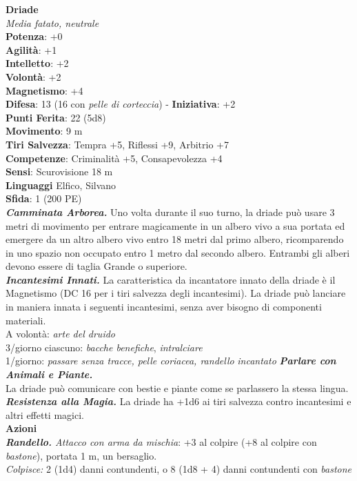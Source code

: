 \begin{multicols}{2}
\medskip\textbf{Driade}\\
\emph{Media fatato, neutrale}\\
\textbf{Potenza}: +0\\
\textbf{Agilità}: +1\\
\textbf{Intelletto}: +2\\
\textbf{Volontà}: +2\\
\textbf{Magnetismo}: +4\\
\textbf{Difesa}: 13 (16 con \emph{pelle di corteccia}) - \textbf{Iniziativa}: +2\\
\textbf{Punti Ferita}: 22 (5d8)\\
\textbf{Movimento}: 9 m\\
\textbf{Tiri Salvezza}: Tempra +5, Riflessi +9, Arbitrio +7\\
\textbf{Competenze}: Criminalità +5, Consapevolezza +4\\
\textbf{Sensi}: Scurovisione 18 m\\
\textbf{Linguaggi} Elfico, Silvano\\
\textbf{Sfida}: 1 (200 PE)\smallskip\\
\emph{\textbf{Camminata Arborea.}} Uno volta durante il suo turno, la driade può usare 3 metri di movimento per entrare magicamente in un albero vivo a sua portata ed emergere da un altro albero vivo entro 18 metri dal primo albero, ricomparendo in uno spazio non occupato entro 1 metro dal secondo albero. Entrambi gli alberi devono essere di taglia Grande o superiore.\\
\emph{\textbf{Incantesimi Innati.}} La caratteristica da incantatore innato della driade è il Magnetismo (DC  16 per i tiri salvezza degli incantesimi). La driade può lanciare in maniera innata i seguenti incantesimi, senza aver bisogno di componenti materiali.\\
A volontà: \emph{arte del druido}\\
3/giorno ciascuno: \emph{bacche benefiche}, \emph{intralciare}\\
1/giorno: \emph{passare senza tracce, pelle coriacea, randello} \emph{incantato} \emph{\textbf{Parlare con Animali e Piante.}}\\
La driade può comunicare con bestie e piante come se parlassero la stessa lingua.\\
\emph{\textbf{Resistenza alla Magia.}} La driade ha +1d6 ai tiri salvezza contro incantesimi e altri effetti magici.\\
\smallskip\textbf{Azioni}\\
\emph{\textbf{Randello.} Attacco con arma da mischia}: +3 al colpire (+8 al colpire con \emph{bastone}), portata 1 m, un bersaglio.\\
\emph{Colpisce:} 2 (1d4) danni contundenti, o 8 (1d8 + 4) danni contundenti con \emph{bastone}\\


\end{multicols}
